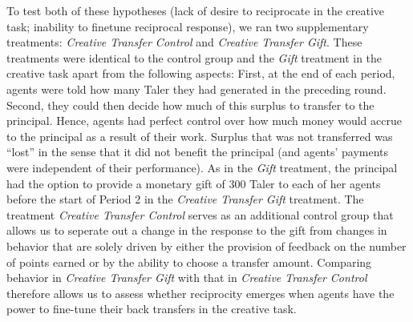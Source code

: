 To test both of these hypotheses (lack of desire to reciprocate in the creative task; inability to finetune reciprocal response), we 
ran two supplementary treatments: \textit{Creative Transfer Control}
 and \textit{Creative Transfer Gift}. These treatments were identical to the control 
group and the \textit{Gift} treatment in the creative task apart from the following aspects: 
First,  at the end of each period, agents were told how many Taler they 
had generated in the preceding round. Second,
they could then decide how much of this surplus to transfer 
to the principal. Hence, agents had perfect control over how much money would accrue 
to the principal as a result of their work. Surplus that was not transferred was ``lost'' in the 
sense that it did not benefit the principal (and agents' payments 
were independent of their performance). 
As in the \textit{Gift} treatment, the principal had the option to provide a 
monetary gift of 300 Taler to each of her agents before the start of Period 2 
in the \textit{Creative Transfer Gift} treatment. The treatment 
\textit{Creative Transfer Control} serves as an additional control group that allows 
us to seperate out a change in the response to the gift from changes in behavior that are solely 
driven by either the provision of feedback 
on the number of points earned or by the 
ability to choose a transfer amount. 
Comparing behavior in \textit{Creative Transfer Gift} with that in \textit{Creative Transfer Control} 
therefore allows us to assess whether reciprocity emerges when agents have the power to 
  fine-tune their back transfers in the creative task. 
 
